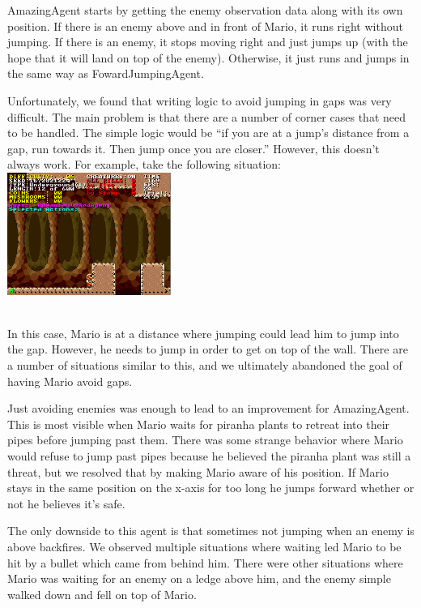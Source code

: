 \documentclass[12pt]{article}
\begin{document}
\begin{multicols*}{2}
AmazingAgent starts by getting the enemy observation data along with its own position.  If there is 
an enemy above and in front of Mario, it runs right without jumping.  If there is an enemy, it stops 
moving right and just jumps up (with the hope that it will land on top of the enemy).  Otherwise, 
it just runs and jumps in the same way as FowardJumpingAgent.

Unfortunately, we found that writing logic to avoid jumping in gaps was very difficult.  The main 
problem is that there are a number of corner cases that need to be handled.  The simple logic would 
be ``if you are at a jump's distance from a gap, run towards it.  Then jump once you are closer.''  
However, this doesn't always work.  For example, take the following situation:
\hspace{5mm}
\\

\begingroup
    \centering
    \includegraphics[width=0.4\textwidth]{gap_issue}
\endgroup

\hspace{5mm}
\\
In this case, Mario is at a distance where jumping could lead him to jump into the gap.  However, 
he needs to jump in order to get on top of the wall.  There are a number of situations similar to 
this, and we ultimately abandoned the goal of having Mario avoid gaps.

Just avoiding enemies was enough to lead to an improvement for AmazingAgent.  This is most 
visible when Mario waits for piranha plants to retreat into their pipes before jumping past them.  
There was some strange behavior where Mario would refuse to jump past pipes because he believed 
the piranha plant was still a threat, but we resolved that by making Mario aware of his position.  If 
Mario stays in the same position on the x-axis for too long he jumps forward whether or not he believes 
it's safe.

The only downside to this agent is that sometimes not jumping when an enemy is above backfires.  
We observed multiple situations where waiting led Mario to be hit by a bullet which came from behind 
him.  There were other situations where Mario was waiting for an enemy on a ledge above him, and 
the enemy simple walked down and fell on top of Mario.


\end{multicols*}
\end{document}
